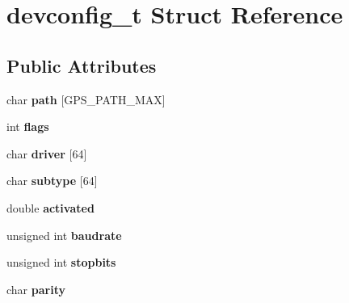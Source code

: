 \hypertarget{structdevconfig__t}{\section{devconfig\-\_\-t \-Struct \-Reference}
\label{structdevconfig__t}
}
\subsection*{\-Public \-Attributes}
\begin{DoxyCompactItemize}
\item 
\hypertarget{structdevconfig__t_ae06b1de9d1f6b19c8edf7a3d2fd418e1}{char {\bfseries path} \mbox{[}\-G\-P\-S\-\_\-\-P\-A\-T\-H\-\_\-\-M\-A\-X\mbox{]}}\label{structdevconfig__t_ae06b1de9d1f6b19c8edf7a3d2fd418e1}

\item 
\hypertarget{structdevconfig__t_adf3edce1f1f145a5aaf7e61db95903e6}{int {\bfseries flags}}\label{structdevconfig__t_adf3edce1f1f145a5aaf7e61db95903e6}

\item 
\hypertarget{structdevconfig__t_acf26acad980ca3b792acbd422b7bcaa2}{char {\bfseries driver} \mbox{[}64\mbox{]}}\label{structdevconfig__t_acf26acad980ca3b792acbd422b7bcaa2}

\item 
\hypertarget{structdevconfig__t_a5f4d930e6bfa8a0bec72327fe60e9224}{char {\bfseries subtype} \mbox{[}64\mbox{]}}\label{structdevconfig__t_a5f4d930e6bfa8a0bec72327fe60e9224}

\item 
\hypertarget{structdevconfig__t_a9e1b0c34f7dcb49fdc0fa1a3f9c636e1}{double {\bfseries activated}}\label{structdevconfig__t_a9e1b0c34f7dcb49fdc0fa1a3f9c636e1}

\item 
\hypertarget{structdevconfig__t_a635733f81be1a8ce1f1eb1e90e48c8d0}{unsigned int {\bfseries baudrate}}\label{structdevconfig__t_a635733f81be1a8ce1f1eb1e90e48c8d0}

\item 
\hypertarget{structdevconfig__t_ae71e8eb881c49804645d8cea89b0443c}{unsigned int {\bfseries stopbits}}\label{structdevconfig__t_ae71e8eb881c49804645d8cea89b0443c}

\item 
\hypertarget{structdevconfig__t_a65053d61ff24734f719b9c7df413cc92}{char {\bfseries parity}}\label{structdevconfig__t_a65053d61ff24734f719b9c7df413cc92}


\end{DoxyCompactItemize}
